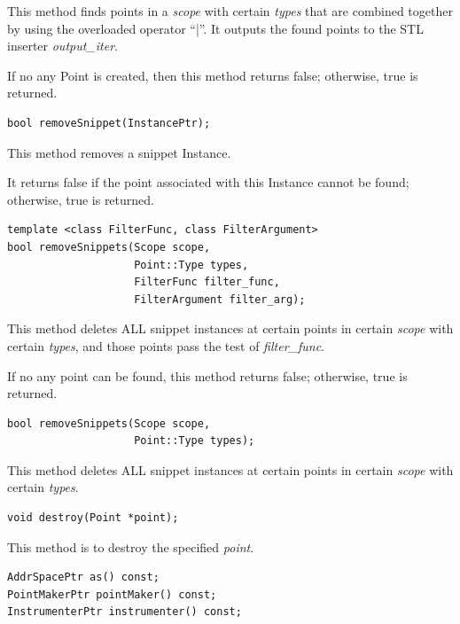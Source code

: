 \documentclass[11pt]{article}
\begin{document}
This method finds points in a \emph{scope} with certain \emph{types} that are combined
together by using the overloaded operator ``|''. It outputs the found points to
the STL inserter \emph{output\_iter}.

If no any Point is created, then this method returns false; otherwise, true is
returned.


\begin{verbatim}
bool removeSnippet(InstancePtr);

\end{verbatim}



This method removes a snippet Instance.

It returns false if the point associated with this Instance cannot be found;
otherwise, true is returned.


\begin{verbatim}
template <class FilterFunc, class FilterArgument>
bool removeSnippets(Scope scope,
                    Point::Type types,
                    FilterFunc filter_func,
                    FilterArgument filter_arg);

\end{verbatim}



This method deletes ALL snippet instances at certain points in certain \emph{scope}
with certain \emph{types}, and those points pass the test of \emph{filter\_func}.

If no any point can be found, this method returns false; otherwise, true is
returned.


\begin{verbatim}
bool removeSnippets(Scope scope,
                    Point::Type types);

\end{verbatim}



This method deletes ALL snippet instances at certain points in certain \emph{scope}
with certain \emph{types}.


\begin{verbatim}
void destroy(Point *point);

\end{verbatim}



This method is to destroy the specified \emph{point}.


\begin{verbatim}
AddrSpacePtr as() const;
PointMakerPtr pointMaker() const;
InstrumenterPtr instrumenter() const;

\end{verbatim}
\end{document}
